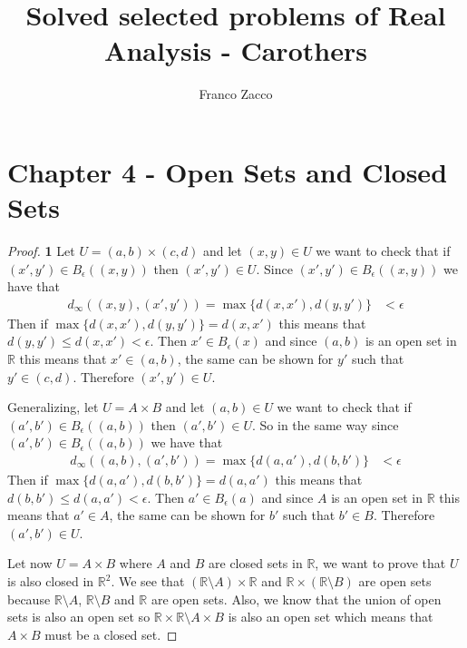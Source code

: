 \documentclass[11pt]{article}
\title{\textbf{Solved selected problems of Real Analysis - Carothers}}
\author{Franco Zacco}
\date{}
\newcommand{\R}{\mathbb{R}}
\theoremstyle{definition}
\begin{document}
\maketitle
\thispagestyle{empty}

\section*{Chapter 4 - Open Sets and Closed Sets}

	\begin{proof}{\textbf{1}}
        Let $U = (a,b)\times (c,d)$ and let $(x,y) \in U$ we want to check that
        if $(x',y') \in B_{\epsilon}((x,y))$ then $(x', y') \in U$. Since
        $(x',y') \in B_{\epsilon}((x,y))$ we have that  
        \begin{align*}
            d_\infty((x,y),(x',y')) = \max\{d(x,x'), d(y,y')\} &< \epsilon
        \end{align*}
        Then if $\max\{d(x,x'), d(y,y')\} = d(x,x')$ this means that\\
        $d(y,y') \leq d(x,x') < \epsilon$. Then $x' \in B_{\epsilon}(x)$ and since
        $(a,b)$ is an open set in $\R$ this means that $x' \in (a,b)$, the same can be
        shown for $y'$ such that $y' \in (c,d)$. Therefore $(x', y') \in U$. 

        Generalizing, let $U = A \times B$ and let $(a,b) \in U$ we want to check that
        if $(a',b') \in B_{\epsilon}((a,b))$ then $(a', b') \in U$. So in the same way
        since $(a',b') \in B_{\epsilon}((a,b))$ we have that  
        \begin{align*}
            d_\infty((a,b),(a',b')) = \max\{d(a,a'), d(b,b')\} &< \epsilon
        \end{align*}
        Then if $\max\{d(a,a'), d(b,b')\} = d(a,a')$ this means that\\
        $d(b,b') \leq d(a,a') < \epsilon$. Then $a' \in B_{\epsilon}(a)$ and since
        $A$ is an open set in $\R$ this means that $a' \in A$, the same can be
        shown for $b'$ such that $b' \in B$. Therefore $(a', b') \in U$.

        Let now $U = A \times B$ where $A$ and $B$ are closed sets in $\R$, we want to
        prove that $U$ is also closed in $\R^2$. We see that
        $(\R \setminus A) \times \R$ and $\R \times (\R \setminus B)$ are open sets because
        $\R \setminus A$, $\R \setminus B$ and $\R$ are open sets. Also, we know that
        the union of open sets is also an open set so
        $\R \times \R \setminus A \times B$ is also an open set which means that
        $A \times B$ must be a closed set.
    \end{proof}
\end{document}
